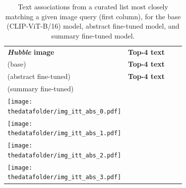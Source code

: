 \documentclass[10pt]{article} %
\newcommand{\hubble}{\emph{Hubble}\xspace}
\begin{document}
\begin{table}[h!]
  \centering
  \renewcommand{\arraystretch}{0.1}
  \begin{tabular}{m{3cm} m{3.2cm} m{3.2cm} m{3.2cm}}
      \toprule
      \centering \bfseries \hubble image & \centering \textbf{Top-4 text} \\ {\textcolor{deeppurple}{(base)}} & \centering  \textbf{Top-4 text} \\ {\textcolor{deepblue}{(abstract fine-tuned)}} & \centering  \textbf{Top-4 text} \\ {\textcolor{deepred}{(summary fine-tuned)}} \tabularnewline
      \midrule
      \centering \texttt{[image: \\thedatafolder/img\_itt\_abs\_0.pdf]} & \centering \scriptsize  & \centering  \scriptsize  &  {\scriptsize } \tabularnewline
      \midrule
      \centering \texttt{[image: \\thedatafolder/img\_itt\_abs\_1.pdf]} & \centering \scriptsize  & \centering  \scriptsize  &  {\scriptsize } \tabularnewline
      \midrule
      \centering \texttt{[image: \\thedatafolder/img\_itt\_abs\_2.pdf]} & \centering \scriptsize  & \centering  \scriptsize  &  {\scriptsize } \tabularnewline
      \midrule
      \centering \texttt{[image: \\thedatafolder/img\_itt\_abs\_3.pdf]} & \centering \scriptsize  & \centering  \scriptsize  &  {\scriptsize } \tabularnewline
      \bottomrule
  \end{tabular}
  \caption{Text associations from a curated list most closely matching a given image query (first column), for the \textcolor{deeppurple}{base} (CLIP-ViT-B/16) model, \textcolor{deepblue}{abstract fine-tuned} model, and \textcolor{deepred}{summary fine-tuned} model.}
  \label{tab:itt_abs}
\end{table}
  
\end{document}
